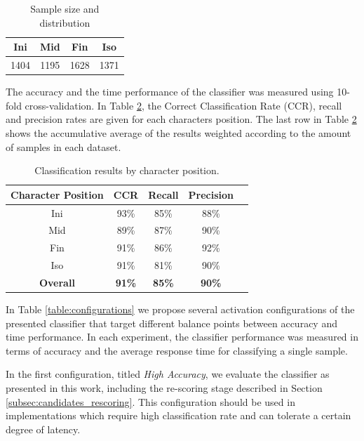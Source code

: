 \begin{table}[b]
\centering
\begin{tabular}{ | c | c | c | c |}
\hline                 
  Ini & Mid & Fin & Iso \\ 
  \hline
  1404 & 1195 & 1628 & 1371 \\
  \hline
\end{tabular}
\caption{Sample size and distribution}
\label{table:sample_set} 
\end{table}

The accuracy and the time performance of the classifier was measured using 10-fold cross-validation.
In Table \ref{table:results_position}, the Correct Classification Rate (CCR), recall and precision rates are given for each characters position.
The last row in Table \ref{table:results_position} shows the accumulative average of the results weighted according to the amount of samples in each dataset.

\begin{table}
\centering
\renewcommand{\arraystretch}{1.2}
\begin{tabular}{ | c | c | c | c | c |}
\hline
	\textbf{Character Position} & \textbf{CCR} & \textbf{Recall} &  \textbf{Precision} \\
	\hline 
	Ini & 93\% & 85\% & 88\% \\                
  	\hline
  	Mid & 89\% & 87\% & 90\% \\
  	\hline
  	Fin & 91\% &  86\% & 92\% \\
  	\hline
  	Iso & 91\% &  81\% & 90\% \\
  	\hline
  	\textbf{Overall} & \textbf{91\%} &  \textbf{85\%} & \textbf{90\%} \\
  	\hline
\end{tabular}
\caption{Classification results by character position.}
\label{table:results_position} 
\end{table}

In Table \ref{table:configurations} we propose several activation configurations of the presented classifier that target different balance points between accuracy and time performance.
In each experiment, the classifier performance was measured in terms of accuracy and the average response time for classifying a single sample.

In the first configuration, titled \emph{High Accuracy}, we evaluate the classifier as presented in this work, including the re-scoring stage described in Section \ref{subsec:candidates_rescoring}.
This configuration should be used in implementations which require high classification rate and can tolerate a certain degree of latency.

